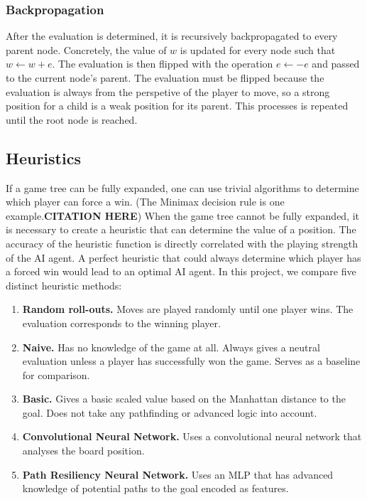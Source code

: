 \documentclass[10pt]{article}
\begin{document}
\subsubsection{Backpropagation}

After the evaluation is determined, it is recursively backpropagated to every parent node. Concretely, the value of $w$ is updated for every node such that $w \gets w + e$. The evaluation is then flipped with the operation $e \gets -e$ and passed to the current node's parent. The evaluation must be flipped because the evaluation is always from the perspetive of the player to move, so a strong position for a child is a weak position for its parent. This processes is repeated until the root node is reached.

\subsection{Heuristics}

If a game tree can be fully expanded, one can use trivial algorithms to determine which player can force a win. (The Minimax decision rule is one example.\textbf{CITATION HERE}) When the game tree cannot be fully expanded, it is necessary to create a heuristic that can determine the value of a position. The accuracy of the heuristic function is directly correlated with the playing strength of the AI agent. A perfect heuristic that could always determine which player has a forced win would lead to an optimal AI agent. In this project, we compare five distinct heuristic methods:

\begin{enumerate}
    \item \textbf{Random roll-outs.} Moves are played randomly until one player wins. The evaluation corresponds to the winning player.
    \item \textbf{Naive.} Has no knowledge of the game at all. Always gives a neutral evaluation unless a player has successfully won the game. Serves as a baseline for comparison.
    \item \textbf{Basic.} Gives a basic scaled value based on the Manhattan distance to the goal. Does not take any pathfinding or advanced logic into account.
    \item \textbf{Convolutional Neural Network.} Uses a convolutional neural network that analyses the board position.
    \item \textbf{Path Resiliency Neural Network.} Uses an MLP that has advanced knowledge of potential paths to the goal encoded as features.
\end{enumerate}
\end{document}
